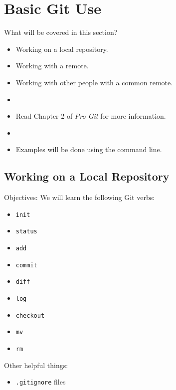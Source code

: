 \section{Basic Git Use}

\begin{frame}[t]{What will be covered in this section?}
  \begin{itemize}
    \item Working on a local repository.
    \item Working with a remote.
    \item Working with other people with a common remote.
    \item[]
    \item Read Chapter 2 of {\it Pro Git} for more information.
    \item[]
    \item Examples will be done using the command line.
  \end{itemize}
\end{frame}


\subsection{Working on a Local Repository}
\begin{frame}[t]{Objectives:}
    We will learn the following Git verbs:
  \begin{itemize}
    \item {\tt init}
    \item {\tt status}
    \item {\tt add}
    \item {\tt commit}
    \item {\tt diff}
    \item {\tt log}
    \item {\tt checkout} 
    \item {\tt mv} 
    \item {\tt rm}
  \end{itemize}
  
  Other helpful things:
  \begin{itemize}
    \item {\tt .gitignore} files
  \end{itemize}
\end{frame}

\begin{frame}[t]{}
\end{frame}

